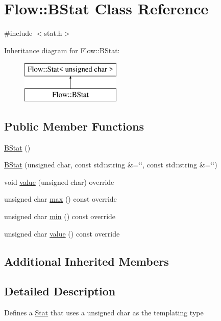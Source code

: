 \hypertarget{class_flow_1_1_b_stat}{}\section{Flow\+:\+:B\+Stat Class Reference}
\label{class_flow_1_1_b_stat}


{\ttfamily \#include $<$stat.\+h$>$}

Inheritance diagram for Flow\+:\+:B\+Stat\+:\begin{figure}[H]
\begin{center}
\leavevmode
\includegraphics[height=2.000000cm]{class_flow_1_1_b_stat}
\end{center}
\end{figure}
\subsection*{Public Member Functions}
\begin{DoxyCompactItemize}
\item 
\hyperlink{class_flow_1_1_b_stat_ab1b39226cb1935d921c3b3c426f402eb}{B\+Stat} ()
\item 
\hyperlink{class_flow_1_1_b_stat_a90a451cf84259983e2097470b09bb30b}{B\+Stat} (unsigned char, const std\+::string \&=\char`\"{}\char`\"{}, const std\+::string \&=\char`\"{}\char`\"{})
\item 
void \hyperlink{class_flow_1_1_b_stat_a65299c411a0e8767b6715557de1cbf23}{value} (unsigned char) override
\item 
unsigned char \hyperlink{class_flow_1_1_b_stat_adcd3075bd06f64d690e66067047f0121}{max} () const override
\item 
unsigned char \hyperlink{class_flow_1_1_b_stat_a815c577e96e80df05112d5e7928789c1}{min} () const override
\item 
unsigned char \hyperlink{class_flow_1_1_b_stat_aafd9dbf4e02e6fbfc3bc3dfb572496dc}{value} () const override
\end{DoxyCompactItemize}
\subsection*{Additional Inherited Members}


\subsection{Detailed Description}
Defines a \hyperlink{class_flow_1_1_stat}{Stat} that uses a unsigned char as the templating type 

